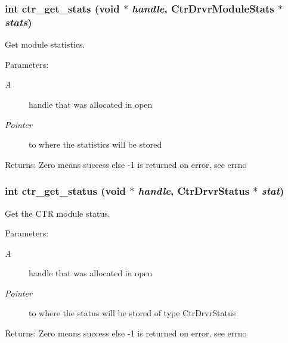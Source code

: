 \subsubsection{\setlength{\rightskip}{0pt plus 5cm}int ctr\_\-get\_\-stats (void $\ast$ {\em handle}, Ctr\-Drvr\-Module\-Stats $\ast$ {\em stats})}\label{libctr_8doxygen_7ecf44d2882ca5e45aaacdf3a0fd7de9}


Get module statistics. 

\begin{Desc}
\item[Parameters:]
\begin{description}
\item[{\em A}]handle that was allocated in open \item[{\em Pointer}]to where the statistics will be stored \end{description}
\end{Desc}
\begin{Desc}
\item[Returns:]Zero means success else -1 is returned on error, see errno \end{Desc}
\subsubsection{\setlength{\rightskip}{0pt plus 5cm}int ctr\_\-get\_\-status (void $\ast$ {\em handle}, Ctr\-Drvr\-Status $\ast$ {\em stat})}\label{libctr_8doxygen_b07057467de4749943fc90bd785da954}


Get the CTR module status. 

\begin{Desc}
\item[Parameters:]
\begin{description}
\item[{\em A}]handle that was allocated in open \item[{\em Pointer}]to where the status will be stored of type Ctr\-Drvr\-Status \end{description}
\end{Desc}
\begin{Desc}
\item[Returns:]Zero means success else -1 is returned on error, see errno \end{Desc}
